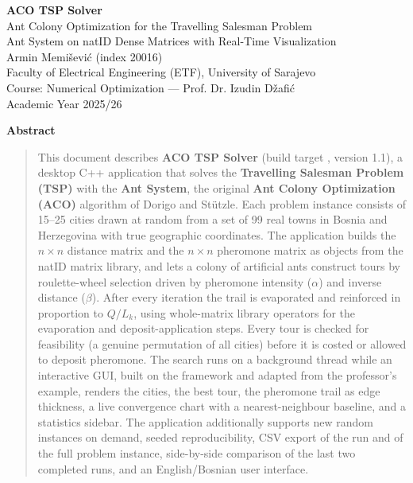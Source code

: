\documentclass[11pt,a4paper]{article}
\begin{document}
\thispagestyle{plain}
\begin{center}
\vspace*{1.2cm}
{\LARGE\bfseries ACO TSP Solver}\\[10pt]
{\large Ant Colony Optimization for the Travelling Salesman Problem}\\[2pt]
{\large Ant System on natID Dense Matrices with Real-Time Visualization}\\[16pt]
{\large Armin Memišević} \quad (index 20016)\\[4pt]
Faculty of Electrical Engineering (ETF), University of Sarajevo\\
Course: Numerical Optimization --- Prof. Dr. Izudin Džafić\\[10pt]
{\large Academic Year 2025/26}
\end{center}

\vspace{0.6cm}
\begin{center}\textbf{Abstract}\end{center}
\begin{quote}\small
This document describes \textbf{ACO TSP Solver} (build target , version 1.1), a desktop
C++ application that solves the \textbf{Travelling Salesman Problem (TSP)} with the
\textbf{Ant System}, the original \textbf{Ant Colony Optimization (ACO)} algorithm of Dorigo and Stützle.
Each problem instance consists of 15--25 cities drawn at random from a set of 99 real towns in Bosnia and
Herzegovina with true geographic coordinates. The application builds the $n\times n$ distance matrix and the $n\times n$ pheromone matrix
as  objects from the natID matrix library, and lets a colony of artificial ants
construct tours by roulette-wheel selection driven by pheromone intensity ($\alpha$) and inverse
distance ($\beta$). After every iteration the trail is evaporated and reinforced in proportion to
$Q/L_k$, using whole-matrix library operators for the evaporation and deposit-application steps. Every
tour is checked for feasibility (a genuine permutation of all cities) before it is costed or allowed to
deposit pheromone. The search runs on a background thread while an interactive GUI, built on the
 framework and adapted from the professor's  example, renders the cities,
the best tour, the pheromone trail as edge thickness, a live convergence chart with a
nearest-neighbour baseline, and a statistics sidebar. The application additionally supports new random
instances on demand, seeded reproducibility, CSV export of the run and of the full problem instance,
side-by-side comparison of the last two completed runs, and an English/Bosnian user interface.
\end{quote}
\end{document}
